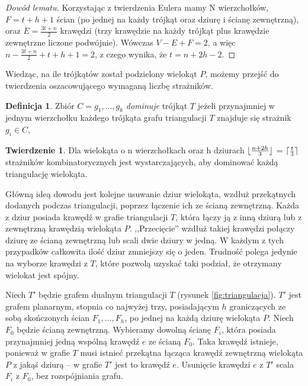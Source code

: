 \documentclass[brudnopis]{xmgr}
\DeclarePairedDelimiter\ceil{\lceil}{\rceil}
\DeclarePairedDelimiter\floor{\lfloor}{\rfloor}
\theoremstyle{definition}
\newtheorem{Twierdzenie}{Twierdzenie}
\newtheorem{Definicja}{Definicja}
\begin{document}
\begin{proof}[Dowód lematu]
	Korzystając z twierdzenia Eulera mamy N wierzchołków, $F = t + h + 1$ ścian (po jednej na każdy trójkąt oraz dziurę i ścianę zewnętrzną), oraz $E = \frac{3t+n}{2}$ krawędzi (trzy krawędzie na każdy trójkąt plus krawędzie zewnętrzne liczone podwójnie).  Wówczas $V - E + F = 2$, a więc $n - \frac{3t+n}{2} + t + h + 1 = 2$, z czego wynika, że $t = n + 2h - 2$.
\end{proof}
Wiedząc, na ile trójkątów został podzielony wielokąt $P$, możemy przejść do twierdzenia oszacowującego wymaganą liczbę strażników.


\begin{Definicja} \cite{orourke}
  Zbiór $C = {g_1,\ldots,g_k}$ \emph{dominuje} trójkąt $T$ jeżeli przynajmniej w jednym  wierzchołku każdego trójkąta grafu triangulacji $T$ znajduje się strażnik $g_i \in C$,
\end{Definicja}

\begin{Twierdzenie} \cite{orourke}
  Dla wielokąta o n wierzchołkach oraz h dziurach $\floor{\frac{n+2h}{3}}$ = $\ceil{\frac{t}{3}}$ strażników kombinatorycznych jest wystarczających, aby dominować każdą triangulację wielokąta.
\end{Twierdzenie}

\indent Główną ideą dowodu jest kolejne usuwanie dziur wielokąta, wzdłuż przekątnych dodanych podczas triangulacji, poprzez łączenie ich ze ścianą zewnętrzną. Każda z dziur posiada krawędź w grafie triangulacji $T$, która łączy ją z inną dziurą lub z zewnętrzną krawędzią wielokąta $P$. ,,Przecięcie'' wzdłuż takiej krawędzi połączy dziurę ze ścianą zewnętrzną lub scali dwie dziury w jedną. W każdym z tych przypadków całkowita ilość dziur zmniejszy się o jeden. Trudność polega jedynie na wyborze krawędzi z $T$, które pozwolą uzyskać taki podział, że otrzymany wielokat jest spójny.

\indent Niech $T'$ będzie grafem dualnym triangulacji $T$ (rysunek \ref{fig:triangulacja}). $T'$ jest grafem planarnym, stopnia co najwyżej trzy, posiadającym $h$ graniczących ze sobą skończonych ścian $F_1, \ldots, F_h$, po jednej na każdą dziurę wielokąta $P$. Niech $F_0$ będzie ścianą zewnętrzną. Wybieramy dowolną ścianę $F_i$, która posiada przynajmniej jedną wspólną krawędź $e$ ze ścianą $F_0$. Taka krawędź istnieje, ponieważ w grafie $T$ musi istnieć przekątna łącząca krawędź zewnętrzną wielokąta $P$ z jakąś dziurą -- w grafie $T'$ jest to krawędź $e$. Usunięcie krawędzi $e$ z $T'$ scala $F_i$ z $F_0$, bez rozspójniania grafu.
\end{document}
